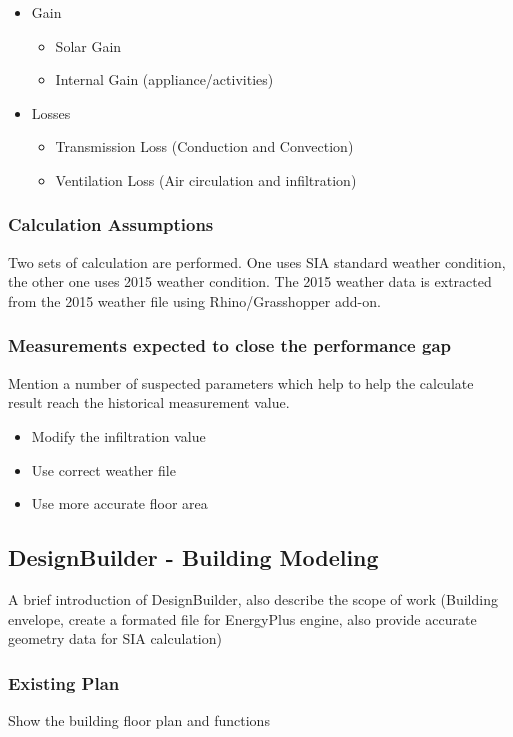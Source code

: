 \documentclass[11pt, a4paper]{article}
\theoremstyle{definition}
\begin{document}
			\begin{itemize}
				\item Gain
				\begin{itemize}
					\item Solar Gain
					\item Internal Gain (appliance/activities)
				\end{itemize}
				\item Losses
				\begin{itemize}
					\item Transmission Loss (Conduction and Convection)
					\item Ventilation Loss (Air circulation and infiltration)
				\end{itemize}
			\end{itemize}

		\subsubsection{Calculation Assumptions}	
			Two sets of calculation are performed. One uses SIA standard weather condition, the other one uses 2015 weather condition. The 2015 weather data is extracted from the 2015 weather file using Rhino/Grasshopper add-on.
		
		\subsubsection{Measurements expected to close the performance gap}
			Mention a number of suspected parameters which help to help the calculate result reach the historical measurement value.
			\begin{itemize}
				\item Modify the infiltration value
				\item Use correct weather file
				\item Use more accurate floor area
			\end{itemize}


	\subsection{DesignBuilder - Building Modeling}
		A brief introduction of DesignBuilder, also describe the scope of work (Building envelope, create a formated file for EnergyPlus engine, also provide accurate geometry data for SIA calculation)
		
		\subsubsection{Existing Plan}
		Show the building floor plan and functions
		
\end{document}
